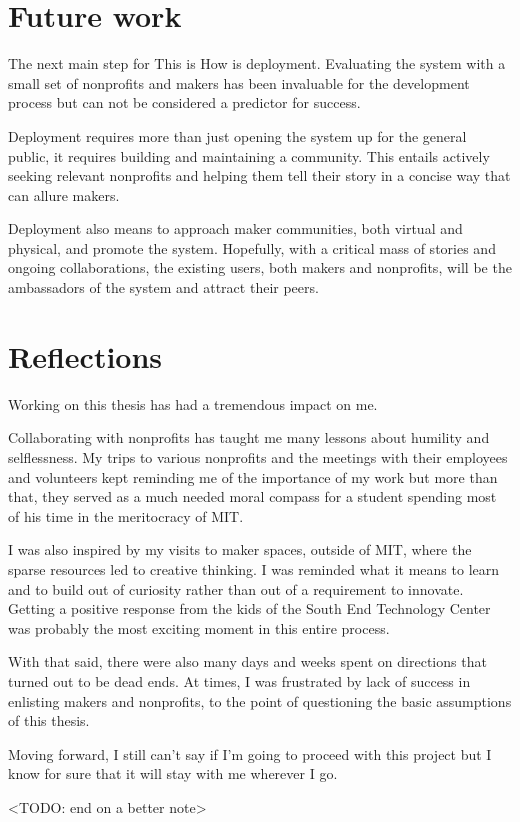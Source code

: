 \section{Future work}

The next main step for This is How is deployment. Evaluating the system with a small set of nonprofits and makers has been invaluable for the development process but can not be considered a predictor for success.

Deployment requires more than just opening the system up for the general public, it requires building and maintaining a community. This entails actively seeking relevant nonprofits and helping them tell their story in a concise way that can allure makers. 

Deployment also means to approach maker communities, both virtual and physical, and promote the system. Hopefully, with a critical mass of stories and ongoing collaborations, the existing users, both makers and nonprofits, will be the ambassadors of the system and attract their peers.

\section{Reflections}

Working on this thesis has had a tremendous impact on me.

Collaborating with nonprofits has taught me many lessons about humility and selflessness. My trips to various nonprofits and the meetings with their employees and volunteers kept reminding me of the importance of my work but more than that, they served as a much needed moral compass for a student spending most of his time in the meritocracy of MIT.

I was also inspired by my visits to maker spaces, outside of MIT, where the sparse resources led to creative thinking. I was reminded what it means to learn and to build out of curiosity rather than out of a requirement to innovate. Getting a positive response from the kids of the South End Technology Center was probably the most exciting moment in this entire process.

With that said, there were also many days and weeks spent on directions that turned out to be dead ends. At times, I was frustrated by lack of success in enlisting makers and nonprofits, to the point of questioning the basic assumptions of this thesis.

Moving forward, I still can't say if I'm going to proceed with this project but I know for sure that it will stay with me wherever I go.

<TODO: end on a better note>
